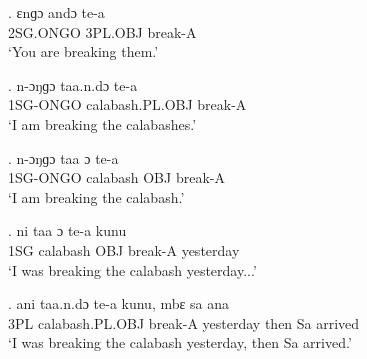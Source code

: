\documentclass{assets/fieldnotes}
\begin{document}
\exg.
ɛnɡɔ       andɔ      te-a    \\
2SG.ONGO   3PL.OBJ   break-A \\%
`You are breaking them.'

\exg.
n-ɔŋɡɔ     taa.n.dɔ          te-a    \\
1SG-ONGO   calabash.PL.OBJ   break-A \\%
`I am breaking the calabashes.'

\exg.
n-ɔŋɡɔ     taa        ɔ     te-a    \\
1SG-ONGO   calabash   OBJ   break-A \\%
`I am breaking the calabash.'

\exg.
ni    taa        ɔ     te-a      kunu      \\
1SG   calabash   OBJ   break-A   yesterday \\%
`I was breaking the calabash yesterday...'

\exg.
ani   taa.n.dɔ          te-a      kunu,       mbɛ    sa   ana     \\
3PL   calabash.PL.OBJ   break-A   yesterday   then   Sa   arrived \\%
`I was breaking the calabash yesterday, then Sa arrived.'


\end{document}
